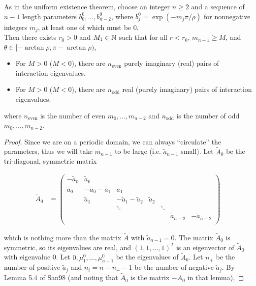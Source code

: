 \documentclass[thesis.tex]{subfiles}
\begin{document}
\begin{lemma}\label{inteigsparity}
As in the uniform existence theorem, choose an integer $n \geq 2$ and a sequence of $n-1$ length parameters $b_0^0, \dots, b_{n-2}^0$, where $b_j^0 = \exp(-m_j \pi / \rho )$ for nonnegative integers $m_j$, at least one of which must be 0.\\

Then there exists $r_0 > 0$ and $M_1 \in {\mathbb N}$ such that for all $r < r_0$, $m_{n-1} \geq M$, and $\theta \in [-\arctan \rho, \pi - \arctan \rho)$, 

\begin{itemize}
\item For $M > 0$ ($M < 0$), there are $n_{\text{even}}$ purely imaginary (real) pairs of interaction eigenvalues.
\item For $M > 0$ ($M < 0$), there are $n_{\text{odd}}$ real (purely imaginary) pairs of interaction eigenvalues.
\end{itemize}

where $n_{\text{even}}$ is the number of even $m_0, \dots, m_{n-2}$ and $n_{\text{odd}}$ is the number of odd $m_0, \dots, m_{n-2}$.

\begin{proof}
Since we are on a periodic domain, we can always ``circulate'' the parameters, thus we will take $m_{n-1}$ to be large (i.e. $\tilde{a}_{n-1}$ small). Let $\tilde{A}_0$ be the tri-diagonal, symmetric matrix 

\begin{align*}
\tilde{A}_0 &= \begin{pmatrix}
-\tilde{a}_0 & \tilde{a}_0 \\
\tilde{a}_0 & -\tilde{a}_0 - \tilde{a}_1 &  \tilde{a}_1 \\
& \tilde{a}_1 & -\tilde{a}_1 - \tilde{a}_2 &  \tilde{a}_2 \\
& & \ddots & & \ddots \\
& & & & & \tilde{a}_{n-2} & -\tilde{a}_{n-2} \\
\end{pmatrix}
\end{align*}

which is nothing more than the matrix $\tilde{A}$ with $\tilde{a}_{n-1} = 0$. The matrix $\tilde{A}_0$ is symmetric, so its eigenvalues are real, and $(1, 1, \dots, 1)^T$ is an eigenvector of $\tilde{A}_0$ with eigenvalue 0. Let $0, \mu^0_1, \dots, \mu^0_{n-1}$ be the eigenvalues of $\tilde{A}_0$. Let $n_+$ be the number of positive $\tilde{a}_j$ and $n_i = n - n_+ - 1$ be the number of negative $\tilde{a}_j$. By Lemma 5.4 of San98 (and noting that $\tilde{A}_0$ is the matrix $-A_0$ in that lemma),


\end{proof}
\end{lemma}
\end{document}
